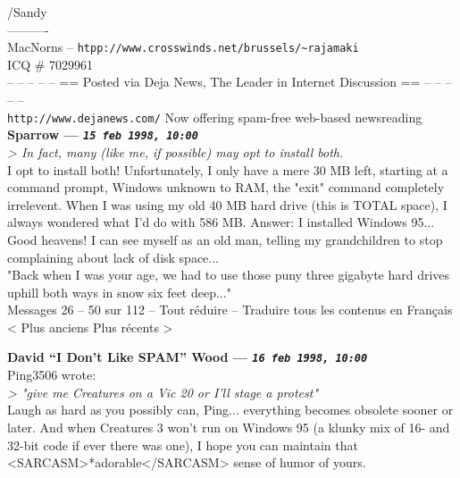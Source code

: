 \documentclass[11pt,twoside,a4paper]{article}
\begin{document}
\begin{multicols*}{2}
/Sandy~\\
----------~\\
MacNorns -- \texttt{htpp://www.crosswinds.net/brussels/\textasciitilde rajamaki}~\\
ICQ \# 7029961~\\

-- -- -- -- -- == Posted via Deja News, The Leader in Internet Discussion == -- -- -- -- --~\\ 
\texttt{http://www.dejanews.com/}   Now offering spam-free web-based newsreading~\\

 
		
	
		
\textbf{Sparrow --- \emph{\texttt{15 feb 1998, 10:00}}}~\\

\emph{> In fact, many (like me, if possible) may opt to install both.}~\\

I opt to install both! Unfortunately, I only have a mere 30 MB left, starting at a command prompt, Windows unknown to RAM, the "exit" command completely irrelevent. When I was using my old 40 MB hard drive (this is TOTAL space), I always wondered what I'd do with 586 MB. Answer: I installed Windows 95...~\\

Good heavens! I can see myself as an old man, telling my grandchildren to stop complaining about lack of disk space...~\\

"Back when I was your age, we had to use those puny three gigabyte hard drives uphill both ways in snow six feet deep..."~\\ 

	
	  	Messages 26 -- 50 sur 112 -- Tout r{\'e}duire  --  Traduire tous les contenus en Fran\c{c}ais 	< Plus anciens  Plus r{\'e}cents >
	
		
\textbf{David ``I Don't Like SPAM'' Wood --- \emph{\texttt{16 feb 1998, 10:00}}}~\\

Ping3506 wrote:~\\
\emph{> "give me Creatures on a Vic 20 or I'll stage a protest"}~\\

Laugh as hard as you possibly can, Ping... everything becomes obsolete sooner or later. And when Creatures 3 won't run on Windows 95 (a klunky mix of 16- and 32-bit code if ever there was one), I hope you can maintain that <SARCASM>*adorable</SARCASM> sense of humor of yours.~\\


\end{multicols*}
\end{document}
